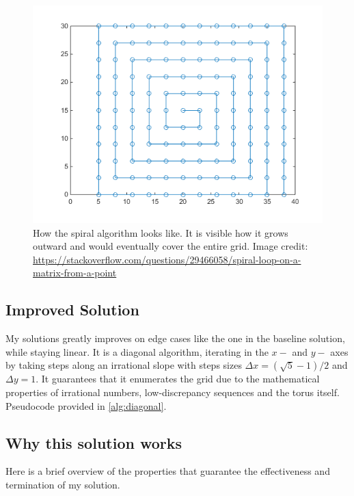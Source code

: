 \documentclass{article}
\begin{document}
\begin{figure}[H]
\begin{minipage}{0.5\textwidth}
    \end{minipage}
    \hfill
    \begin{minipage}{0.45\textwidth}
        \centering
        \includegraphics[width=\linewidth]{grid_spiral.png}
        \caption{How the spiral algorithm looks like. It is visible how it grows outward and would eventually cover the entire grid. Image credit: \url{https://stackoverflow.com/questions/29466058/spiral-loop-on-a-matrix-from-a-point}}
        \label{fig:visualization-of-spiral-algorithm}
    \end{minipage}
\end{figure}

\subsection*{Improved Solution}

My solutions greatly improves on edge cases like the one in the baseline
solution, while staying linear. It is a diagonal algorithm, iterating in the
$x-$ and $y-$ axes by taking steps along an irrational slope with steps sizes
$\Delta x = (\sqrt 5 - 1)/2$ and $\Delta y = 1$. It guarantees that it
enumerates the grid due to the mathematical properties of irrational numbers,
low-discrepancy sequences and the torus itself. Pseudocode provided in
\autoref{alg:diagonal}.

\subsection*{Why this solution works}
Here is a brief overview of the properties that guarantee the effectiveness and
termination of my solution.
\end{document}

